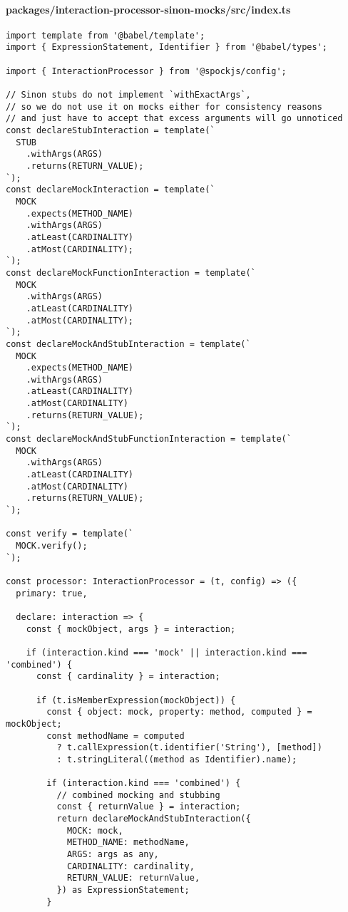 \paragraph*{packages/interaction-processor-sinon-mocks/src/index.ts}
\begin{verbatim}
import template from '@babel/template';
import { ExpressionStatement, Identifier } from '@babel/types';

import { InteractionProcessor } from '@spockjs/config';

// Sinon stubs do not implement `withExactArgs`,
// so we do not use it on mocks either for consistency reasons
// and just have to accept that excess arguments will go unnoticed
const declareStubInteraction = template(`
  STUB
    .withArgs(ARGS)
    .returns(RETURN_VALUE);
`);
const declareMockInteraction = template(`
  MOCK
    .expects(METHOD_NAME)
    .withArgs(ARGS)
    .atLeast(CARDINALITY)
    .atMost(CARDINALITY);
`);
const declareMockFunctionInteraction = template(`
  MOCK
    .withArgs(ARGS)
    .atLeast(CARDINALITY)
    .atMost(CARDINALITY);
`);
const declareMockAndStubInteraction = template(`
  MOCK
    .expects(METHOD_NAME)
    .withArgs(ARGS)
    .atLeast(CARDINALITY)
    .atMost(CARDINALITY)
    .returns(RETURN_VALUE);
`);
const declareMockAndStubFunctionInteraction = template(`
  MOCK
    .withArgs(ARGS)
    .atLeast(CARDINALITY)
    .atMost(CARDINALITY)
    .returns(RETURN_VALUE);
`);

const verify = template(`
  MOCK.verify();
`);

const processor: InteractionProcessor = (t, config) => ({
  primary: true,

  declare: interaction => {
    const { mockObject, args } = interaction;

    if (interaction.kind === 'mock' || interaction.kind === 'combined') {
      const { cardinality } = interaction;

      if (t.isMemberExpression(mockObject)) {
        const { object: mock, property: method, computed } = mockObject;
        const methodName = computed
          ? t.callExpression(t.identifier('String'), [method])
          : t.stringLiteral((method as Identifier).name);

        if (interaction.kind === 'combined') {
          // combined mocking and stubbing
          const { returnValue } = interaction;
          return declareMockAndStubInteraction({
            MOCK: mock,
            METHOD_NAME: methodName,
            ARGS: args as any,
            CARDINALITY: cardinality,
            RETURN_VALUE: returnValue,
          }) as ExpressionStatement;
        }


\end{verbatim}
